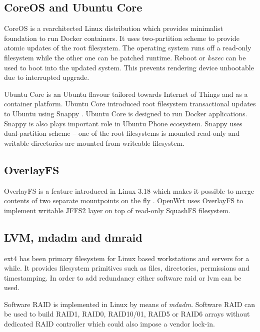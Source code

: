 \documentclass[a4paper,11pt]{kth-mag}
\begin{document}
\subsection{CoreOS and Ubuntu Core}

CoreOS \cite{coreos} is a rearchitected Linux
distribution which provides minimalist foundation to run Docker containers.
It uses two-partition scheme to provide atomic updates of the root
filesystem. The operating system runs off a read-only filesystem
while the other one can be patched runtime. Reboot or \emph{kexec}
can be used to boot into the updated system. This prevents rendering
device unbootable due to interrupted upgrade.

Ubuntu Core is an Ubuntu flavour tailored towards Internet of Things
and as a container platform. Ubuntu Core introduced root filesystem
transactional updates to Ubuntu using Snappy
\cite{snappy-ubuntu}.
Ubuntu Core is designed to run Docker applications.
Snappy is also plays important role in Ubuntu Phone ecosystem.
Snappy uses dual-partition scheme --
one of the root filesystems is mounted read-only and
writable directories are mounted from writeable filesystem.



\subsection{OverlayFS}

OverlayFS is a feature introduced in Linux 3.18 which makes it
possible to merge contents of two separate mountpoints on the fly \cite{overlayfs}.
OpenWrt uses OverlayFS to implement writable JFFS2 layer on top of
read-only SquashFS filesystem.

\subsection{LVM, mdadm and dmraid}

\acrshort{ext4} has been primary filesystem for Linux based workstations and
servers for a while. It provides filesystem primitives such as files,
directories, permissions and timestamping.
In order to add redundancy
either software \acrfull{raid} or \acrfull{lvm} can be used.

Software RAID is implemented in Linux by means of \emph{mdadm}.
Software RAID can be used to build RAID1, RAID0, RAID10/01, RAID5
or RAID6 arrays without dedicated RAID controller which could also
impose a vendor lock-in.
\end{document}
